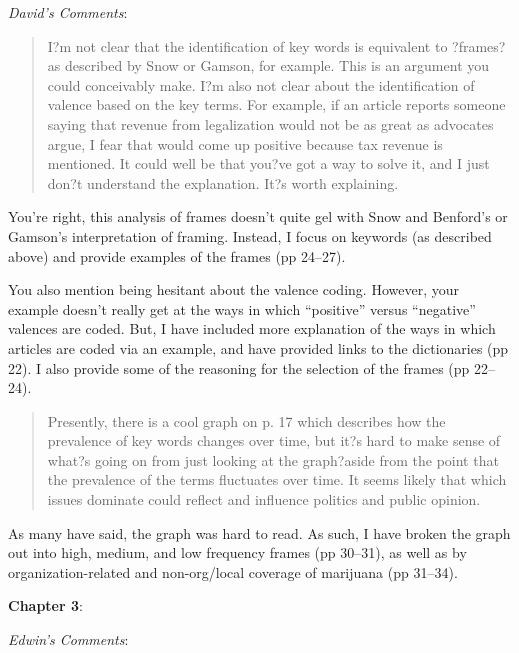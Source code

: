\documentclass[12pt,stdletter,dateno,sigleft]{newlfm} %
\begin{document}
\begin{newlfm}
\textit{David's Comments}:


\begin{quotation}{\color{red}\noindent \footnotesize
I?m not clear that the identification of key words is equivalent to ?frames? as described by Snow or Gamson, for example. This is an argument you could conceivably make. I?m also not clear about the identification of valence based on the key terms. For example, if an article reports someone saying that revenue from legalization would not be as great as advocates argue, I fear that would come up positive because tax revenue is mentioned. It could well be that you?ve got a way to solve it, and I just don?t understand the explanation. It?s worth explaining.
}
\end{quotation}




You're right, this analysis of frames doesn't quite gel with Snow and Benford's or Gamson's interpretation of framing. Instead, I focus on keywords (as described above) and provide examples of the frames (pp 24--27). 

You also mention being hesitant about the valence coding. However, your example doesn't really get at the ways in which ``positive'' versus ``negative'' valences are coded. But, I have included more explanation of the ways in which articles are coded via an example, and have provided links to the dictionaries (pp 22). I also provide some of the reasoning for the selection of the frames (pp 22--24).





\begin{quotation}{\color{red}\noindent \footnotesize
Presently, there is a cool graph on p. 17 which describes how the prevalence of key words changes over time, but it?s hard to make sense of what?s going on from just looking at the graph?aside from the point that the prevalence of the terms fluctuates over time. It seems likely that which issues dominate could reflect and influence politics and public opinion.
}
\end{quotation}


As many have said, the graph was hard to read. As such, I have broken the graph out into high, medium, and low frequency frames (pp 30--31), as well as by organization-related and non-org/local coverage of marijuana (pp 31--34).\newline


\textbf{Chapter 3}: 

\textit{Edwin's Comments}:


\end{newlfm}
\end{document}
